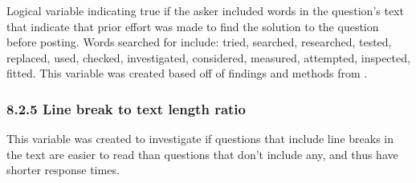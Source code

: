 \documentclass{article}
\begin{document}
Logical variable indicating true if the asker included words in the question's text that indicate that prior effort was made to find the solution to the question before posting. Words searched for include: tried, searched, researched, tested, replaced, used, checked, investigated, considered, measured, attempted, inspected, fitted. This variable was created based off of findings and methods from \cite{Bhat2014} \cite{Harper2008}. 


\subsubsection*{8.2.5 Line break to text length ratio}

This variable was created to investigate if questions that include line breaks in the text are easier to read than questions that don't include any, and thus have shorter response times. 





\end{document}
